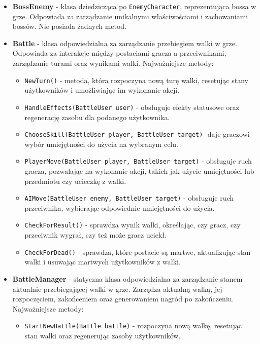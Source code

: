 \begin{itemize}
\begin{itemize}
            \end{itemize}
        \item \textbf{BossEnemy} - klasa dziedzicząca po \texttt{EnemyCharacter}, reprezentująca bossa w grze. 
        Odpowiada za zarządzanie unikalnymi właściwościami i zachowaniami bossów. Nie posiada żadnych metod.
        \item \textbf{Battle} - klasa odpowiedzialna za zarządzanie przebiegiem walki w grze. 
        Odpowiada za interakcje między postaciami gracza a przeciwnikami, zarządzanie turami oraz wynikami walki. Najważniejsze metody:
            \begin{itemize}
                \item \texttt{NewTurn()} - metoda, która rozpoczyna nową turę walki, resetując stany użytkowników i umożliwiając im wykonanie akcji.
                \item \texttt{HandleEffects(BattleUser user)} - obsługuje efekty statusowe oraz regenerację zasobu dla podanego użytkownika.
                \item \texttt{ChooseSkill(BattleUser player, BattleUser target)}- daje graczowi wybór umiejętności do użycia na wybranym celu.
                \item \texttt{PlayerMove(BattleUser player, BattleUser target)} - obsługuje ruch gracza, pozwalając na wykonanie akcji, takich jak użycie 
                umiejętności lub przedmiotu czy ucieczkę z walki.
                \item \texttt{AIMove(BattleUser enemy, BattleUser target)} - obsługuje ruch przeciwnika, wybierając odpowiednie umiejętności do użycia.
                \item \texttt{CheckForResult()} - sprawdza wynik walki, określając, czy gracz, czy przeciwnik wygrał, czy też może gracz uciekł.
                \item \texttt{CheckForDead()} - sprawdza, które postacie są martwe, aktualizując stan walki i usuwając martwych użytkowników z walki.
            \end{itemize}
        \item \textbf{BattleManager} - statyczna klasa odpowiedzialna za zarządzanie stanem aktualnie przebiegającej walki w grze. 
        Zarządza aktualną walką, jej rozpoczęciem, zakońceniem oraz generowaniem nagród po zakończeniu. Najważniejsze metody:
            \begin{itemize}
                \item \texttt{StartNewBattle(Battle battle)} - rozpoczyna nową walkę, resetując stan walki oraz regenerując zasoby użytkowników.

\end{itemize}
\end{itemize}
